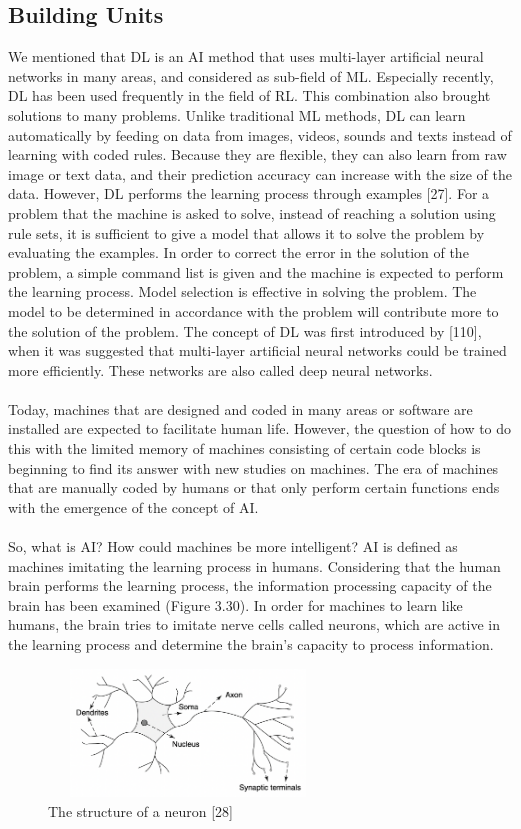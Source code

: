 \documentclass[12pt,twoside,a4]{mwbk}
\begin{document}
\subsection{Building Units}
We mentioned that DL is an AI method that uses multi-layer artificial neural networks in many areas, and considered as sub-field of ML. Especially recently, DL has been used frequently in the field of RL. This combination also brought solutions to many problems. Unlike traditional ML methods, DL can learn automatically by feeding on data from images, videos, sounds and texts instead of learning with coded rules. Because they are flexible, they can also learn from raw image or text data, and their prediction accuracy can increase with the size of the data. However, DL performs the learning process through examples [27]. For a problem that the machine is asked to solve, instead of reaching a solution using rule sets, it is sufficient to give a model that allows it to solve the problem by evaluating the examples. In order to correct the error in the solution of the problem, a simple command list is given and the machine is expected to perform the learning process. Model selection is effective in solving the problem. The model to be determined in accordance with the problem will contribute more to the solution of the problem. The concept of DL was first introduced by [110], when it was suggested that multi-layer artificial neural networks could be trained more efficiently. These networks are also called deep neural networks.
\\ \\
Today, machines that are designed and coded in many areas or software are installed are expected to facilitate human life. However, the question of how to do this with the limited memory of machines consisting of certain code blocks is beginning to find its answer with new studies on machines. The era of machines that are manually coded by humans or that only perform certain functions ends with the emergence of the concept of AI. 
\\ \\
So, what is AI? How could machines be more intelligent? AI is defined as machines imitating the learning process in humans. Considering that the human brain performs the learning process, the information processing capacity of the brain has been examined (Figure 3.30). In order for machines to learn like humans, the brain tries to imitate nerve cells called neurons, which are active in the learning process and determine the brain's capacity to process information.
\begin{figure}[h]
    \centering
    \includegraphics[width=7.4cm, height=3.4cm]{neuron.png}
    \caption{The structure of a neuron [28]}
\end{figure}
\end{document}

